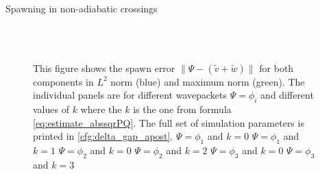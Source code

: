 \begin{chapter}{Spawning in non-adiabatic crossings}
\begin{figure}[h!]
{  }
   \\
   \\
  \caption[Spawning error in the $L^2$ and maximum norm for a non-adiabatic example]{
  This figure shows the spawn error $\| \Psi - (\tilde{v} + \tilde{w})\|$ for both
  components in $L^2$ norm (blue) and maximum norm (green). The individual panels are
  for different wavepackets $\Psi = \phi_i$ and different values of $k$ where the $k$ is
  the one from formula \eqref{eq:estimate_abssqrPQ}.
  The full set of simulation parameters is printed in \ref{cfg:delta_gap_apost}.
   $\Psi = \phi_1$ and $k=0$
   $\Psi = \phi_1$ and $k=1$
   $\Psi = \phi_2$ and $k=0$
   $\Psi = \phi_2$ and $k=2$
   $\Psi = \phi_3$ and $k=0$
   $\Psi = \phi_3$ and $k=3$
  \label{fig:spawn_delta_gap_spawn_errors1}
  }
\end{figure}



\end{chapter}

